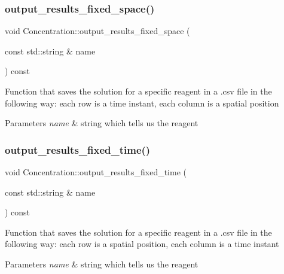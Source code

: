 \subsubsection{\texorpdfstring{output\+\_\+results\+\_\+fixed\+\_\+space()}{output\_results\_fixed\_space()}}
{\footnotesize\ttfamily void Concentration\+::output\+\_\+results\+\_\+fixed\+\_\+space (\begin{DoxyParamCaption}\item[{const std\+::string \&}]{name }\end{DoxyParamCaption}) const}

Function that saves the solution for a specific reagent in a .csv file in the following way\+: each row is a time instant, each column is a spatial position 
\begin{DoxyParams}{Parameters}
{\em name} & string which tells us the reagent \\
\hline
\end{DoxyParams}
\mbox{\label{classConcentration_a3949ab18b97ffe8dfe1db0015c8f7541}} 
\subsubsection{\texorpdfstring{output\+\_\+results\+\_\+fixed\+\_\+time()}{output\_results\_fixed\_time()}}
{\footnotesize\ttfamily void Concentration\+::output\+\_\+results\+\_\+fixed\+\_\+time (\begin{DoxyParamCaption}\item[{const std\+::string \&}]{name }\end{DoxyParamCaption}) const}

Function that saves the solution for a specific reagent in a .csv file in the following way\+: each row is a spatial position, each column is a time instant 
\begin{DoxyParams}{Parameters}
{\em name} & string which tells us the reagent \\
\hline
\end{DoxyParams}
\mbox{\label{classConcentration_ac214e0b8b1723da27b5ef9711bb5e5d9}} 
